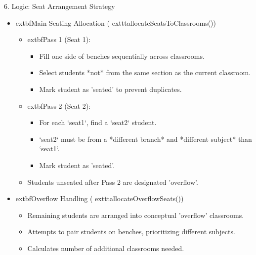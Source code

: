 \documentclass{beamer}
\begin{document}
\begin{frame}{6. Logic: Seat Arrangement Strategy}
    \begin{itemize}
        \item 	extbf{Main Seating Allocation (	exttt{allocateSeatsToClassrooms()})}
        \begin{itemize}
            \item 	extbf{Pass 1 (Seat 1):}
            \begin{itemize}
                \item Fill one side of benches sequentially across classrooms.
                \item Select students *not* from the same section as the current classroom.
                \item Mark student as 'seated' to prevent duplicates.
            \end{itemize}
            \item 	extbf{Pass 2 (Seat 2):}
            \begin{itemize}
                \item For each `seat1`, find a `seat2` student.
                \item `seat2` must be from a *different branch* and *different subject* than `seat1`.
                \item Mark student as 'seated'.
            \end{itemize}
            \item Students unseated after Pass 2 are designated 'overflow'.
        \end{itemize}
        \item 	extbf{Overflow Handling (	exttt{allocateOverflowSeats()})}
        \begin{itemize}
            \item Remaining students are arranged into conceptual 'overflow' classrooms.
            \item Attempts to pair students on benches, prioritizing different subjects.
            \item Calculates number of additional classrooms needed.
        \end{itemize}
    \end{itemize}
\end{frame}
\end{document}
